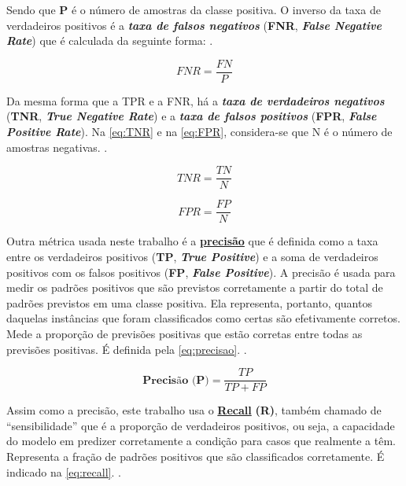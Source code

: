 Sendo que $\textbf{P}$ é o número de amostras da classe positiva. O inverso da taxa de verdadeiros positivos é a \textbf{\textit{taxa de falsos negativos}} (\textbf{FNR}, \textbf{\textit{False Negative Rate}}) que é calculada da seguinte forma: \cite{klosterman_projetos_2020} \cite{hossin_review_2015}.

\begin{equation}\label{eq:FNR}
FNR = \frac{FN}{P}
\end{equation}

Da mesma forma que a TPR e a FNR, há a \textbf{\textit{taxa de verdadeiros negativos}} (\textbf{TNR}, \textbf{\textit{True Negative Rate}}) e a \textbf{\textit{taxa de falsos positivos}} (\textbf{FPR}, \textbf{\textit{False Positive Rate}}). Na \autoref{eq:TNR} e na \autoref{eq:FPR}, considera-se que N é o número de amostras negativas. \cite{klosterman_projetos_2020} \cite{hossin_review_2015}.

\begin{equation}\label{eq:TNR}
TNR = \frac{TN}{N}
\end{equation}

\begin{equation}\label{eq:FPR}
FPR = \frac{FP}{N}
\end{equation}

Outra métrica usada neste trabalho é a \textbf{\underline{precisão}} que é definida como a taxa entre os verdadeiros positivos (\textbf{TP}, \textit{\textbf{True Positive}}) e a soma de verdadeiros positivos com os falsos positivos (\textbf{FP}, \textbf{\textit{False Positive}}). A precisão é usada para medir os padrões positivos que são previstos corretamente a partir do total de padrões previstos em uma classe positiva. Ela representa, portanto, quantos daquelas instâncias que foram classificados como certas são efetivamente corretos. Mede a proporção de previsões positivas que estão corretas entre todas as previsões positivas. É definida pela \autoref{eq:precisao}. \cite{hossin_review_2015}.

\begin{equation}\label{eq:precisao}
\textbf{Precisão (P)} = \frac{TP}{TP + FP}
\end{equation}

Assim como a precisão, este trabalho usa o \textbf{\underline{Recall}} \textbf{(R)}, também chamado de ``sensibilidade'' que é a proporção de verdadeiros positivos, ou seja, a capacidade do modelo em predizer corretamente a condição para casos que realmente a têm. Representa a fração de padrões positivos que são classificados corretamente. É indicado na \autoref{eq:recall}. \cite{hossin_review_2015}.

